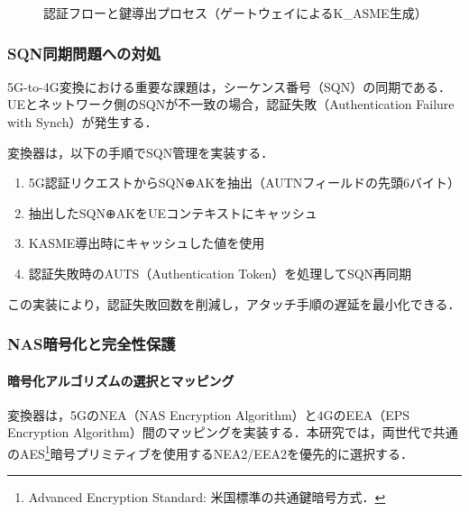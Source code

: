 \begin{figure}[htbp]
  \caption{認証フローと鍵導出プロセス（ゲートウェイによるK\_ASME生成）}
  \label{fig:auth_key_derivation}
\end{figure}

\subsubsection{SQN同期問題への対処}
5G-to-4G変換における重要な課題は，シーケンス番号（SQN）の同期である．UEとネットワーク側のSQNが不一致の場合，認証失敗（Authentication Failure with Synch）が発生する．

変換器は，以下の手順でSQN管理を実装する．

\begin{enumerate}
\item 5G認証リクエストからSQN⊕AKを抽出（AUTNフィールドの先頭6バイト）
\item 抽出したSQN⊕AKをUEコンテキストにキャッシュ
\item KASME導出時にキャッシュした値を使用
\item 認証失敗時のAUTS（Authentication Token）を処理してSQN再同期
\end{enumerate}

この実装により，認証失敗回数を削減し，アタッチ手順の遅延を最小化できる．

\subsubsection{NAS暗号化と完全性保護}
\paragraph{暗号化アルゴリズムの選択とマッピング}
変換器は，5GのNEA（NAS Encryption Algorithm）と4GのEEA（EPS Encryption Algorithm）間のマッピングを実装する．本研究では，両世代で共通のAES\footnote{Advanced Encryption Standard: 米国標準の共通鍵暗号方式．}暗号プリミティブを使用するNEA2/EEA2を優先的に選択する．

